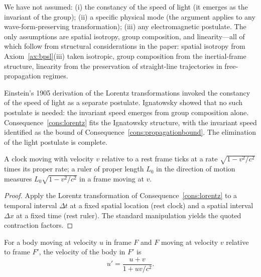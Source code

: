\begin{remark}
We have not assumed: (i) the constancy of the speed of light (it emerges as the invariant of the group); (ii) a specific physical mode (the argument applies to any wave-form-preserving transformation); (iii) any electromagnetic postulate. The only assumptions are spatial isotropy, group composition, and linearity---all of which follow from structural considerations in the paper: spatial isotropy from Axiom~\ref{ax:bpsl}(iii) taken isotropic, group composition from the inertial-frame structure, linearity from the preservation of straight-line trajectories in free-propagation regimes.
\end{remark}

\begin{remark}
Einstein's 1905 derivation \citep{einstein1905relativity} of the Lorentz transformations invoked the constancy of the speed of light as a separate postulate. Ignatowsky \citep{ignatowsky1910} showed that no such postulate is needed: the invariant speed emerges from group composition alone. Consequence~\ref{cons:lorentz} fits the Ignatowsky structure, with the invariant speed identified as the bound of Consequence~\ref{cons:propagationbound}. The elimination of the light postulate is complete.
\end{remark}

\begin{corollary}
\label{cor:timedil}
A clock moving with velocity $v$ relative to a rest frame ticks at a rate $\sqrt{1-v^{2}/c^{2}}$ times its proper rate; a ruler of proper length $L_{0}$ in the direction of motion measures $L_{0}\sqrt{1-v^{2}/c^{2}}$ in a frame moving at $v$.
\end{corollary}

\begin{proof}
Apply the Lorentz transformation of Consequence~\ref{cons:lorentz} to a temporal interval $\Delta t$ at a fixed spatial location (rest clock) and a spatial interval $\Delta x$ at a fixed time (rest ruler). The standard manipulation \citep{landaulifshitz1} yields the quoted contraction factors.
\end{proof}

\begin{corollary}
\label{cor:veladd}
For a body moving at velocity $u$ in frame $F$ and $F$ moving at velocity $v$ relative to frame $F'$, the velocity of the body in $F'$ is
\begin{equation}
u'=\frac{u+v}{1+uv/c^{2}}.
\label{eq:veladd}
\end{equation}
\end{corollary}

